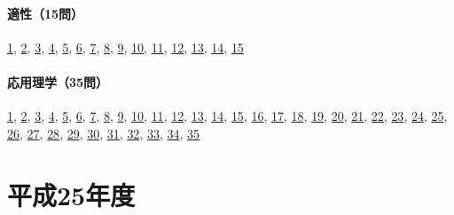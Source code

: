 \paragraph{適性（15問）} \hyperref[q:h24-reg-apt-01]{1}, \hyperref[q:h24-reg-apt-02]{2}, \hyperref[q:h24-reg-apt-03]{3}, \hyperref[q:h24-reg-apt-04]{4}, \hyperref[q:h24-reg-apt-05]{5}, \hyperref[q:h24-reg-apt-06]{6}, \hyperref[q:h24-reg-apt-07]{7}, \hyperref[q:h24-reg-apt-08]{8}, \hyperref[q:h24-reg-apt-09]{9}, \hyperref[q:h24-reg-apt-10]{10}, \hyperref[q:h24-reg-apt-11]{11}, \hyperref[q:h24-reg-apt-12]{12}, \hyperref[q:h24-reg-apt-13]{13}, \hyperref[q:h24-reg-apt-14]{14}, \hyperref[q:h24-reg-apt-15]{15}
\paragraph{応用理学（35問）} \hyperref[q:h24-reg-applied-01]{1}, \hyperref[q:h24-reg-applied-02]{2}, \hyperref[q:h24-reg-applied-03]{3}, \hyperref[q:h24-reg-applied-04]{4}, \hyperref[q:h24-reg-applied-05]{5}, \hyperref[q:h24-reg-applied-06]{6}, \hyperref[q:h24-reg-applied-07]{7}, \hyperref[q:h24-reg-applied-08]{8}, \hyperref[q:h24-reg-applied-09]{9}, \hyperref[q:h24-reg-applied-10]{10}, \hyperref[q:h24-reg-applied-11]{11}, \hyperref[q:h24-reg-applied-12]{12}, \hyperref[q:h24-reg-applied-13]{13}, \hyperref[q:h24-reg-applied-14]{14}, \hyperref[q:h24-reg-applied-15]{15}, \hyperref[q:h24-reg-applied-16]{16}, \hyperref[q:h24-reg-applied-17]{17}, \hyperref[q:h24-reg-applied-18]{18}, \hyperref[q:h24-reg-applied-19]{19}, \hyperref[q:h24-reg-applied-20]{20}, \hyperref[q:h24-reg-applied-21]{21}, \hyperref[q:h24-reg-applied-22]{22}, \hyperref[q:h24-reg-applied-23]{23}, \hyperref[q:h24-reg-applied-24]{24}, \hyperref[q:h24-reg-applied-25]{25}, \hyperref[q:h24-reg-applied-26]{26}, \hyperref[q:h24-reg-applied-27]{27}, \hyperref[q:h24-reg-applied-28]{28}, \hyperref[q:h24-reg-applied-29]{29}, \hyperref[q:h24-reg-applied-30]{30}, \hyperref[q:h24-reg-applied-31]{31}, \hyperref[q:h24-reg-applied-32]{32}, \hyperref[q:h24-reg-applied-33]{33}, \hyperref[q:h24-reg-applied-34]{34}, \hyperref[q:h24-reg-applied-35]{35}
\section{平成25年度}
